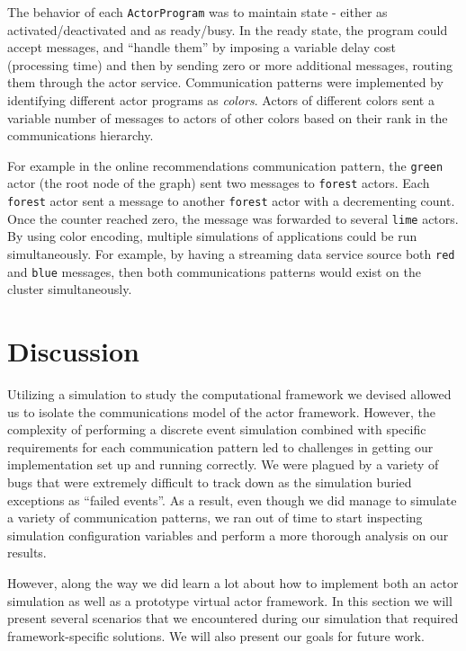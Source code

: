 \documentclass[conference,twocolumn,10pt]{IEEEtran}
\begin{document}
The behavior of each \texttt{ActorProgram} was to maintain state - either as activated/deactivated and as ready/busy. In the ready state, the program could accept messages, and ``handle them'' by imposing a variable delay cost (processing time) and then by sending zero or more additional messages, routing them through the actor service.  Communication patterns were implemented by identifying different actor programs as \textit{colors}. Actors of different colors sent a variable number of messages to actors of other colors based on their rank in the communications hierarchy.

For example in the online recommendations communication pattern, the \texttt{green} actor (the root node of the graph) sent two messages to \texttt{forest} actors. Each \texttt{forest} actor sent a message to another \texttt{forest} actor with a decrementing count. Once the counter reached zero, the message was forwarded to several \texttt{lime} actors. By using color encoding, multiple simulations of applications could be run simultaneously. For example, by having a streaming data service source both \texttt{red} and \texttt{blue} messages, then both communications patterns would exist on the cluster simultaneously.

\section{Discussion}

Utilizing a simulation to study the computational framework we devised allowed us to isolate the communications model of the actor framework. However, the complexity of performing a discrete event simulation combined with specific requirements for each communication pattern led to challenges in getting our implementation set up and running correctly. We were plagued by a variety of bugs that were extremely difficult to track down as the simulation buried exceptions as ``failed events''. As a result, even though we did manage to simulate a variety of communication patterns, we ran out of time to start inspecting simulation configuration variables and perform a more thorough analysis on our results.

However, along the way we did learn a lot about how to implement both an actor simulation as well as a prototype virtual actor framework. In this section we will present several scenarios that we encountered during our simulation that required framework-specific solutions. We will also present our goals for future work.
\end{document}
